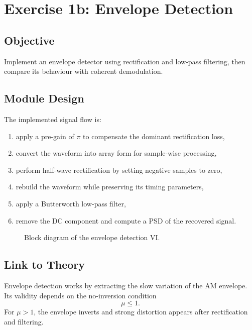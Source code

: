 \section{Exercise 1b: Envelope Detection}
\label{sec:lab2_ex1b}

\subsection{Objective}

Implement an envelope detector using rectification and low-pass filtering, then
compare its behaviour with coherent demodulation.

\subsection{Module Design}

The implemented signal flow is:
\begin{enumerate}
\item apply a pre-gain of $\pi$ to compensate the dominant rectification loss,
\item convert the waveform into array form for sample-wise processing,
\item perform half-wave rectification by setting negative samples to zero,
\item rebuild the waveform while preserving its timing parameters,
\item apply a Butterworth low-pass filter,
\item remove the DC component and compute a PSD of the recovered signal.
\end{enumerate}

\begin{figure}[H]
\centering
{}
\caption{Block diagram of the envelope detection VI.}
\label{fig:lab2_envelope_vi}
\end{figure}

\subsection{Link to Theory}

Envelope detection works by extracting the slow variation of the AM envelope.
Its validity depends on the no-inversion condition
\begin{equation}
\mu \le 1.
\end{equation}
For $\mu > 1$, the envelope inverts and strong distortion appears after
rectification and filtering.

